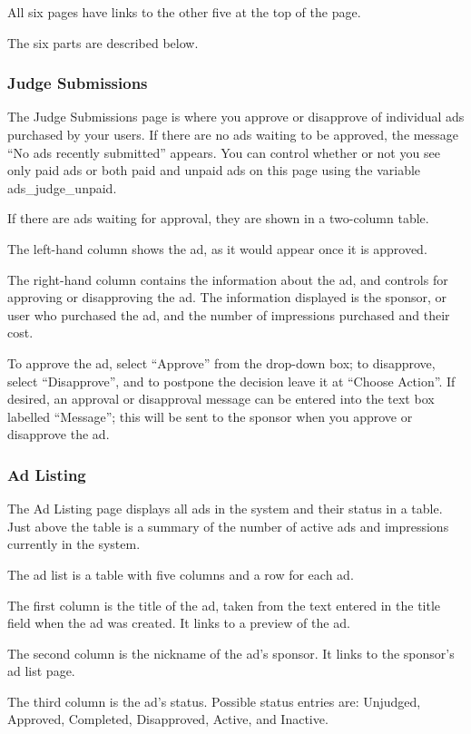 All six pages have links to the other five at the top of the page.

The six parts are described below.

\subsubsection{Judge Submissions}

The Judge Submissions page is where you approve or disapprove of individual ads purchased by your users.  If there are no ads waiting to be approved, the message ``No ads recently submitted'' appears.  You can control whether or not you see only paid ads or both paid and unpaid ads on this page using the variable ads\_judge\_unpaid.

If there are ads waiting for approval, they are shown in a two-column table.

The left-hand column shows the ad, as it would appear once it is approved.

The right-hand column contains the information about the ad, and controls for approving or disapproving the ad.  The information displayed is the sponsor, or user who purchased the ad, and the number of impressions purchased and their cost.

To approve the ad, select ``Approve'' from the drop-down box; to disapprove, select ``Disapprove'', and to postpone the decision leave it at ``Choose Action''.  If desired, an approval or disapproval message can be entered into the text box labelled ``Message''; this will be sent to the sponsor when you approve or disapprove the ad.

\subsubsection{Ad Listing}

The Ad Listing page displays all ads in the system and their status in a table.  Just above the table is a summary of the number of active ads and impressions currently in the system.

The ad list is a table with five columns and a row for each ad.

The first column is the title of the ad, taken from the text entered in the title field when the ad was created.  It links to a preview of the ad.

The second column is the nickname of the ad's sponsor.  It links to the sponsor's ad list page.

The third column is the ad's status.  Possible status entries are: Unjudged, Approved, Completed, Disapproved, Active, and Inactive.

